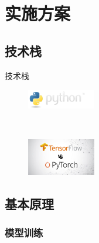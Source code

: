 \documentclass[compress]{beamer}
\begin{document}
\section{实施方案}

\subsection{技术栈}

\begin{frame}{技术栈}
  \begin{figure}[htbp]
    \centering
    \begin{minipage}[t]{0.4\textwidth}
      \centering
      \includegraphics[width=3cm]{python-logo.png}
    \end{minipage}
    \\[5mm]
    \begin{minipage}[t]{0.4\textwidth}
      \centering
      \includegraphics[width=3cm]{d7f4837cf8284e08838d13669f8eb738.png}
    \end{minipage}
  \end{figure}
\end{frame}

\subsection{基本原理}

\subsubsection{模型训练}
\end{document}
